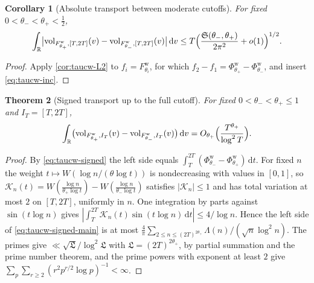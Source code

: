 \documentclass[11pt,a4paper]{article}
\numberwithin{equation}{section}
\newtheorem{theorem}{Theorem}[section]
\newtheorem{corollary}[theorem]{Corollary}
\theoremstyle{definition}
\theoremstyle{remark}
\newcommand{\vol}{\operatorname{vol}}
\newcommand{\dd}{\,\mathrm dt}
\begin{document}
\begin{corollary}[Absolute transport between moderate cutoffs]\label{cor:taucw-mod}
For fixed $0<\theta_-<\theta_+<\frac12$,
\begin{equation}\label{eq:taucw-mod}
\int_{\mathbb R}\bigl|\vol_{F^{\mathrm w}_{\theta_+},[T,2T]}(v)-\vol_{F^{\mathrm w}_{\theta_-},[T,2T]}(v)\bigr|\,\mathrm dv\le T\Bigl(\frac{\mathfrak S(\theta_-,\theta_+)}{2\pi^2}+o(1)\Bigr)^{1/2}.
\end{equation}
\end{corollary}
\begin{proof}
Apply \cref{cor:taucw-L2} to $f_i=F^{\mathrm w}_{\theta_i}$, for which $f_2-f_1=\Phi^{\mathrm w}_{\theta_+}-\Phi^{\mathrm w}_{\theta_-}$, and insert \eqref{eq:taucw-inc}.
\end{proof}

\begin{theorem}[Signed transport up to the full cutoff]\label{thm:taucw-signed}
For fixed $0<\theta_-<\theta_+\le1$ and $I_T=[T,2T]$,
\begin{equation}\label{eq:taucw-signed-main}
\int_{\mathbb R}\bigl(\vol_{F^{\mathrm w}_{\theta_+},I_T}(v)-\vol_{F^{\mathrm w}_{\theta_-},I_T}(v)\bigr)\,\mathrm dv=O_{\theta_+}\Bigl(\frac{T^{\theta_+}}{\log^2T}\Bigr).
\end{equation}
\end{theorem}
\begin{proof}
By \eqref{eq:taucw-signed} the left side equals $\int_T^{2T}(\Phi^{\mathrm w}_{\theta_-}-\Phi^{\mathrm w}_{\theta_+})\dd$. For fixed $n$ the weight $t\mapsto W(\log n/(\theta\log t))$ is nondecreasing with values in $[0,1]$, so $\mathscr K_n(t)=W(\frac{\log n}{\theta_+\log t})-W(\frac{\log n}{\theta_-\log t})$ satisfies $|\mathscr K_n|\le1$ and has total variation at most $2$ on $[T,2T]$, uniformly in $n$. One integration by parts against $\sin(t\log n)$ gives $|\int_T^{2T}\mathscr K_n(t)\sin(t\log n)\dd|\le4/\log n$. Hence the left side of \eqref{eq:taucw-signed-main} is at most $\frac4\pi\sum_{2\le n\le(2T)^{2\theta_+}}\Lambda(n)/(\sqrt n\log^2n)$. The primes give $\ll\sqrt{\mathfrak L}/\log^2\mathfrak L$ with $\mathfrak L=(2T)^{2\theta_+}$, by partial summation and the prime number theorem, and the prime powers with exponent at least $2$ give $\sum_p\sum_{r\ge2}(r^2p^{r/2}\log p)^{-1}<\infty$.
\end{proof}
\end{document}
